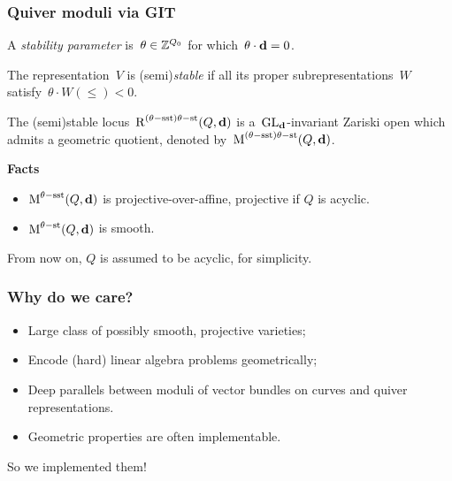 \documentclass{beamer}
\begin{document}
\begin{frame}
    \frametitle{Quiver moduli via GIT}
A \emph{stability parameter} is~$\theta \in \mathbb{Z}^{Q_0}$
for which~$\theta \cdot \mathbf{d} = 0$. \pause
\begin{definition}
The representation~$V$ is (semi)\emph{stable}
if all its proper subrepresentations~$W$ satisfy~$\theta \cdot W (\leq)< 0$.
\end{definition} \pause
\begin{theorem}
The (semi)stable locus~$\operatorname{R}^{(\theta-\mathrm{sst})\theta-\mathrm{st}}(Q, \mathbf{d})$
is a~$\operatorname{GL}_{\mathbf{d}}$-invariant Zariski open which admits a geometric quotient,
denoted by~$\operatorname{M}^{(\theta-\mathrm{sst})\theta-\mathrm{st}}(Q, \mathbf{d})$.
\end{theorem} \pause

\textbf{Facts} \pause

\begin{itemize}
    \item $\operatorname{M}^{\theta-\mathrm{sst}}(Q, \mathbf{d})$ is projective-over-affine,
    projective if $Q$ is acyclic.
    \item $\operatorname{M}^{\theta-\mathrm{st}}(Q, \mathbf{d})$ is smooth.
\end{itemize} \pause
From now on, $Q$ is assumed to be acyclic, for simplicity.
\end{frame}

\begin{frame}
    \frametitle{Why do we care?}
\begin{itemize}
    \item Large class of possibly smooth, projective varieties; \pause
    \item Encode (hard) linear algebra problems geometrically; \pause
    \item Deep parallels between moduli of vector bundles on curves
        and quiver representations. \pause
    \item Geometric properties are often implementable.
\end{itemize} \pause
\vfill
\begin{center}
    So we implemented them!
\end{center}
    

\end{frame}
\end{document}

